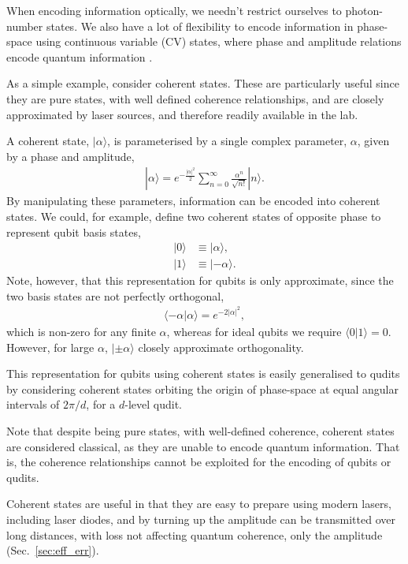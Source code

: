 \documentclass[aps,rmp,twocolumn,amsmath,amssymb,nofootinbib,superscriptaddress,longbibliography,floatfix]{revtex4-1}
\newcommand{\ket}[1]{|#1\rangle}
\begin{document}
When encoding information optically, we needn't restrict ourselves to photon-number states. We also have a lot of flexibility to encode information in phase-space using continuous variable (CV) states, where phase and amplitude relations encode quantum information \cite{bib:CahillGlauber69}.

As a simple example, consider coherent states. These are particularly useful since they are pure states, with well defined coherence relationships, and are closely approximated by laser sources, and therefore readily available in the lab.

A coherent state, $\ket\alpha$, is parameterised by a single complex parameter, $\alpha$, given by a phase and amplitude,
\begin{align}
\ket{\alpha} = e^{-\frac{|\alpha|^2}{2}} \sum_{n=0}^\infty \frac{\alpha^n}{\sqrt{n!}} \ket{n}.
\end{align}
By manipulating these parameters, information can be encoded into coherent states. We could, for example, define two coherent states of opposite phase to represent qubit basis states,
\begin{align}
\ket{0} &\equiv \ket{\alpha}, \nonumber \\
\ket{1} &\equiv \ket{-\alpha}.
\end{align}
Note, however, that this representation for qubits is only approximate, since the two basis states are not perfectly orthogonal,
\begin{align}
\langle -\alpha|\alpha \rangle = e^{-2|\alpha|^2},
\end{align}
which is non-zero for any finite $\alpha$, whereas for ideal qubits we require \mbox{$\langle 0|1\rangle = 0$}. However, for large $\alpha$, $\ket{\pm\alpha}$ closely approximate orthogonality.

This representation for qubits using coherent states is easily generalised to qudits by considering coherent states orbiting the origin of phase-space at equal angular intervals of \mbox{$2\pi/d$}, for a $d$-level qudit.

Note that despite being pure states, with well-defined coherence, coherent states are considered classical, as they are unable to encode quantum information. That is, the coherence relationships cannot be exploited for the encoding of qubits or qudits.

Coherent states are useful in that they are easy to prepare using modern lasers, including laser diodes, and by turning up the amplitude can be transmitted over long distances, with loss not affecting quantum coherence, only the amplitude (Sec.~\ref{sec:eff_err}).
\end{document}
